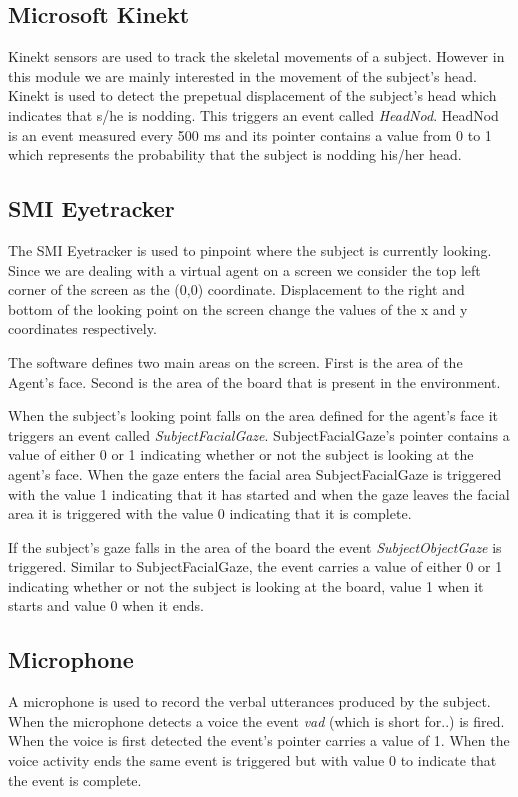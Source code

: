 \documentclass[12pt, a4paper, fleqn]{memoir}%
\begin{document}
\subsection{Microsoft Kinekt}
Kinekt sensors are used to track the skeletal movements of a subject. However in this module we are mainly interested in the movement of the subject's head. Kinekt is used to detect the prepetual displacement of the subject's head which indicates that s/he is nodding. This triggers an event called \textit{HeadNod}. HeadNod is an event measured every 500 ms and its pointer contains a value from 0 to 1 which represents the probability that the subject is nodding his/her head.

\subsection{SMI Eyetracker}
The SMI Eyetracker is used to pinpoint where the subject is currently looking. Since we are dealing with a virtual agent on a screen we consider the top left corner of the screen as the (0,0) coordinate. Displacement to the right and bottom of the looking point on the screen change the values of the x and y coordinates respectively.

The software defines two main areas on the screen. First is the area of the Agent's face. Second is the area of the board that is present in the environment.

When the subject's looking point falls on the area defined for the agent's face it triggers an event called \textit{SubjectFacialGaze}. SubjectFacialGaze's pointer contains a value of either 0 or 1 indicating whether or not the subject is looking at the agent's face. When the gaze enters the facial area SubjectFacialGaze is triggered with the value 1 indicating that it has started and when the gaze leaves the facial area it is triggered with the value 0 indicating that it is complete.

If the subject's gaze falls in the area of the board the event \textit{SubjectObjectGaze} is triggered. Similar to SubjectFacialGaze, the event carries a value of either 0 or 1 indicating whether or not the subject is looking at the board, value 1 when it starts and value 0 when it ends.

\subsection{Microphone}
A microphone is used to record the verbal utterances produced by the subject. When the microphone detects a voice the event \textit{vad} (which is short for..) is fired. When the voice is first detected the event's pointer carries a value of 1. When the voice activity ends the same event is triggered but with value 0 to indicate that the event is complete.
\end{document}
